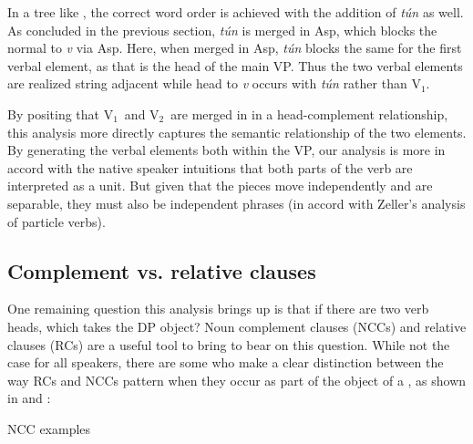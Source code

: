 \documentclass[output=paper]{LSP/langsci}
\begin{document}
In a tree like , the correct word order is achieved with the addition of \textit{t\'{u}n} as well. As concluded in the previous section, \textit{t\'{u}n} is merged in Asp, which blocks the normal  to \textit{v} via Asp. Here, when merged in Asp, \textit{t\'{u}n} blocks the same  for the first verbal element, as that is the head of the main VP. Thus the two verbal elements are realized string adjacent while head  to \textit{v} occurs with \textit{t\'{u}n} rather than V$_{1}$.

By positing that V$_{1}$\ and V$_{2}$\ are merged in in a head-complement relationship, this analysis more directly captures the semantic relationship of the two elements. By generating the verbal elements both within the VP, our analysis is more in accord with the native speaker intuitions that both parts of the verb are interpreted as a unit. But given that the pieces move independently and are separable, they must also be independent phrases (in accord with Zeller's analysis of particle verbs).


\subsection{Complement vs. relative clauses}
One remaining question this analysis brings up is that if there are two verb heads, which takes the DP object? Noun complement clauses (NCCs) and relative clauses (RCs) are a useful tool to bring to bear on this question. While not the case for all speakers, there are some who make a clear distinction between the way RCs and NCCs pattern when they occur as part of the object of a , as shown in  and :

\pagebreak

\ea NCC examples

\z 
\label{ex:parrish:believe-story}
\z
\end{document}
